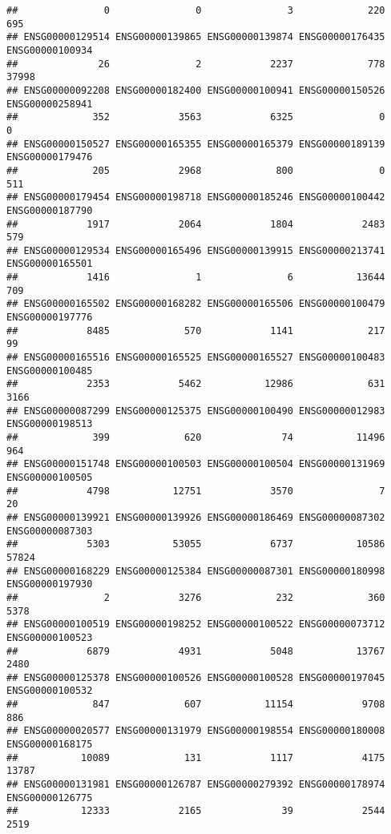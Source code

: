 \documentclass[
]{article}
\begin{document}
\begin{verbatim}
##               0               0               3             220             695 
## ENSG00000129514 ENSG00000139865 ENSG00000139874 ENSG00000176435 ENSG00000100934 
##              26               2            2237             778           37998 
## ENSG00000092208 ENSG00000182400 ENSG00000100941 ENSG00000150526 ENSG00000258941 
##             352            3563            6325               0               0 
## ENSG00000150527 ENSG00000165355 ENSG00000165379 ENSG00000189139 ENSG00000179476 
##             205            2968             800               0             511 
## ENSG00000179454 ENSG00000198718 ENSG00000185246 ENSG00000100442 ENSG00000187790 
##            1917            2064            1804            2483             579 
## ENSG00000129534 ENSG00000165496 ENSG00000139915 ENSG00000213741 ENSG00000165501 
##            1416               1               6           13644             709 
## ENSG00000165502 ENSG00000168282 ENSG00000165506 ENSG00000100479 ENSG00000197776 
##            8485             570            1141             217              99 
## ENSG00000165516 ENSG00000165525 ENSG00000165527 ENSG00000100483 ENSG00000100485 
##            2353            5462           12986             631            3166 
## ENSG00000087299 ENSG00000125375 ENSG00000100490 ENSG00000012983 ENSG00000198513 
##             399             620              74           11496             964 
## ENSG00000151748 ENSG00000100503 ENSG00000100504 ENSG00000131969 ENSG00000100505 
##            4798           12751            3570               7              20 
## ENSG00000139921 ENSG00000139926 ENSG00000186469 ENSG00000087302 ENSG00000087303 
##            5303           53055            6737           10586           57824 
## ENSG00000168229 ENSG00000125384 ENSG00000087301 ENSG00000180998 ENSG00000197930 
##               2            3276             232             360            5378 
## ENSG00000100519 ENSG00000198252 ENSG00000100522 ENSG00000073712 ENSG00000100523 
##            6879            4931            5048           13767            2480 
## ENSG00000125378 ENSG00000100526 ENSG00000100528 ENSG00000197045 ENSG00000100532 
##             847             607           11154            9708             886 
## ENSG00000020577 ENSG00000131979 ENSG00000198554 ENSG00000180008 ENSG00000168175 
##           10089             131            1117            4175           13787 
## ENSG00000131981 ENSG00000126787 ENSG00000279392 ENSG00000178974 ENSG00000126775 
##           12333            2165              39            2544            2519 

\end{verbatim}
\end{document}
